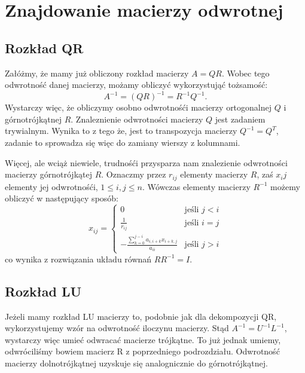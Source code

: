 \section{Znajdowanie macierzy odwrotnej}
\subsection{Rozkład QR}
Załóżmy, że mamy już obliczony rozkład macierzy $A=QR$. Wobec tego
odwrotność danej macierzy, możamy obliczyć wykorzystująć tożsamość:
$$A^{-1}=(QR)^{-1}= R^{-1}Q^{-1}.$$
Wystarczy więc, że obliczymy osobno odwrotnośći macierzy ortogonalnej $Q$ i
górnotrójkątnej $R$. Znaleznienie odwrotności macierzy $Q$ jest zadaniem
trywialnym. Wynika to z tego że, jest to transpozycja macierzy
$Q^{-1}=Q^{T}$, zadanie to sprowadza się więc do zamiany wierszy z
kolumnami.

Więcej, ale wciąż niewiele, trudnośći przysparza nam znalezienie odwrotności
macierzy górnotrójkątej $R$. Oznaczmy przez $r_{ij}$ elementy macierzy $R$,
zaś $x_ij$ elementy jej odwrotnośći, $1 \leq i,j \leq n$. Wówczas elementy
macierzy $R^{-1}$ możemy obliczyć w następujący sposób:
$$ x_{ij}=\left\{\begin{matrix} 0 & \mbox{jeśli } j<i \\
\frac{1}{r_{ij}} & \mbox{jeśli } i=j \\
-\frac{\sum_{k=0}^{j-i}a_{i,i+k}x_{i+k,j}}{a_{ii}} & \mbox{jeśli } j>i \end{matrix}\right.$$
co wynika z rozwiązania układu równań $RR^{-1}=I$.
\subsection{Rozkład LU}
Jeżeli mamy rozkład LU macierzy to, podobnie jak dla dekompozycji QR,
wykorzystujemy wzór na odwrotność iloczynu macierzy. Stąd $A^{-1}=U^{-1}L^{-1}$,
wystarczy więc umieć odwracać macierze trójkątne. To już jednak umiemy, odwróciliśmy
bowiem macierz R z poprzedniego podrozdziału. Odwrotność macierzy dolnotrójkątnej
uzyskuje się analognicznie do górnotrójkątnej.
